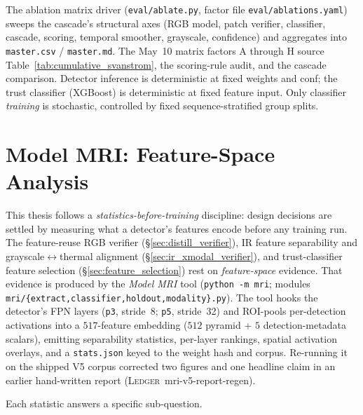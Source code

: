 The ablation matrix driver (\texttt{eval/ablate.py}, factor file \texttt{eval/ablations.yaml}) sweeps the cascade's structural axes (RGB model, patch verifier, classifier, cascade, scoring, temporal smoother, grayscale, confidence) and aggregates into \texttt{master.csv} / \texttt{master.md}. The May~10 matrix factors A through H source Table~\ref{tab:cumulative_svanstrom}, the scoring-rule audit, and the cascade comparison. Detector inference is deterministic at fixed weights and conf; the trust classifier (XGBoost) is deterministic at fixed feature input. Only classifier \emph{training} is stochastic, controlled by fixed sequence-stratified group splits.

\section{Model MRI: Feature-Space Analysis}
\label{sec:model_mri}

This thesis follows a \emph{statistics-before-training} discipline: design decisions are settled by measuring what a detector's features encode before any training run. The feature-reuse RGB verifier (\S\ref{sec:distill_verifier}), IR feature separability and grayscale$\leftrightarrow$thermal alignment (\S\ref{sec:ir_xmodal_verifier}), and trust-classifier feature selection (\S\ref{sec:feature_selection}) rest on \emph{feature-space} evidence. That evidence is produced by the \emph{Model MRI} tool (\texttt{python -m mri}; modules \texttt{mri/\{extract,classifier,holdout,modality\}.py}). The tool hooks the detector's FPN layers (\texttt{p3}, stride~8; \texttt{p5}, stride~32) and ROI-pools per-detection activations into a $517$-feature embedding ($512$ pyramid + $5$ detection-metadata scalars), emitting separability statistics, per-layer rankings, spatial activation overlays, and a \texttt{stats.json} keyed to the weight hash and corpus. Re-running it on the shipped V5 corpus corrected two figures and one headline claim in an earlier hand-written report (\textsc{Ledger}~mri-v5-report-regen).

Each statistic answers a specific sub-question.

